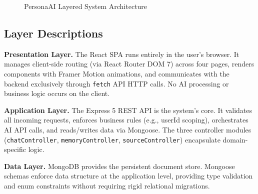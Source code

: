 \documentclass[12pt,a4paper]{report}
\begin{document}
\begin{figure}[H]
\caption{PersonaAI Layered System Architecture}
\label{fig:arch}
\end{figure}

\subsection{Layer Descriptions}

\textbf{Presentation Layer.} The React SPA runs entirely in the user's browser. It manages client-side routing (via React Router DOM 7) across four pages, renders components with Framer Motion animations, and communicates with the backend exclusively through \texttt{fetch} API HTTP calls. No AI processing or business logic occurs on the client.

\textbf{Application Layer.} The Express 5 REST API is the system's core. It validates all incoming requests, enforces business rules (e.g., userId scoping), orchestrates AI API calls, and reads/writes data via Mongoose. The three controller modules (\texttt{chatController}, \texttt{memoryController}, \texttt{sourceController}) encapsulate domain-specific logic.

\textbf{Data Layer.} MongoDB provides the persistent document store. Mongoose schemas enforce data structure at the application level, providing type validation and enum constraints without requiring rigid relational migrations.
\end{document}
